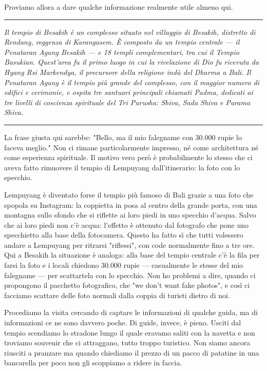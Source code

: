 Proviamo allora a dare qualche informazione realmente utile almeno qui.

\begin{center}
    \noindent\rule{0.6\textwidth}{0.4pt}
\end{center}

\textit{Il tempio di Besakih è un complesso situato nel villaggio di Besakih, distretto di Rendang, reggenza di Karangasem. È composto da un tempio centrale — il Penataran Agung Besakih — e 18 templi complementari, tra cui il Tempio Basukian. Quest'area fu il primo luogo in cui la rivelazione di Dio fu ricevuta da Hyang Rsi Markendya, il precursore della religione indù del Dharma a Bali. Il Penataran Agung è il tempio più grande del complesso, con il maggior numero di edifici e cerimonie, e ospita tre santuari principali chiamati Padma, dedicati ai tre livelli di coscienza spirituale del Tri Purusha: Shiva, Sada Shiva e Parama Shiva.}

\begin{center}
    \noindent\rule{0.6\textwidth}{0.4pt}
\end{center}

La frase giusta qui sarebbe: "Bello, ma il mio falegname con 30.000 rupie lo faceva meglio." Non ci rimane particolarmente impresso, né come architettura né come esperienza spirituale. Il motivo vero però è probabilmente lo stesso che ci aveva fatto rimuovere il tempio di Lempuyang dall'itinerario: la foto con lo specchio.

Lempuyang è diventato forse il tempio più famoso di Bali grazie a una foto che spopola su Instagram: la coppietta in posa al centro della grande porta, con una montagna sullo sfondo che si riflette ai loro piedi in uno specchio d'acqua. Salvo che ai loro piedi non c'è acqua: l'effetto è ottenuto dal fotografo che pone uno specchietto alla base della fotocamera. Questo ha fatto sì che tutti volessero andare a Lempuyang per ritrarsi "riflessi", con code normalmente fino a tre ore. Qui a Besakih la situazione è analoga: alla base del tempio centrale c'è la fila per farsi la foto e i locali chiedono 30.000 rupie — casualmente le stesse del mio falegname — per scattartela con lo specchio. Non ho problemi a dire, quando ci propongono il pacchetto fotografico, che "we don't want fake photos", e così ci facciamo scattare delle foto normali dalla coppia di turisti dietro di noi.

Procediamo la visita cercando di captare le informazioni di qualche guida, ma di informazioni ce ne sono davvero poche. Di guide, invece, è pieno. Usciti dal tempio scendiamo lo stradone lungo il quale eravamo saliti con la navetta e non troviamo souvenir che ci attraggano, tutto troppo turistico. Non siamo ancora riusciti a pranzare ma quando chiediamo il prezzo di un pacco di patatine in una bancarella per poco non gli scoppiamo a ridere in faccia.

